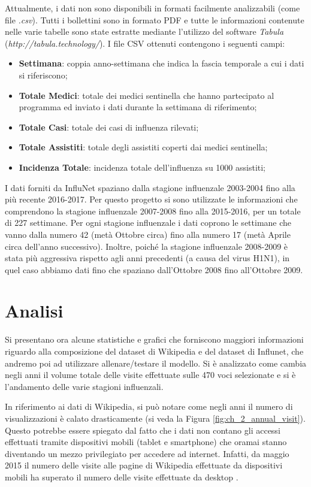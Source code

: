 Attualmente, i dati non sono disponibili in formati facilmente analizzabili (come file \textit{.csv}). Tutti i bollettini
sono in formato PDF e tutte le informazioni contenute nelle varie tabelle sono state estratte mediante l'utilizzo del software \textit{Tabula} (\textit{http://tabula.technology/}). I file CSV ottenuti contengono i seguenti campi:
\begin{itemize}[noitemsep]
\item \textbf{Settimana}: coppia anno-settimana che indica la fascia temporale a cui i dati si riferiscono;
\item \textbf{Totale Medici}: totale dei medici sentinella che hanno partecipato al programma ed inviato i dati durante la settimana di riferimento; 
\item \textbf{Totale Casi}: totale dei casi di influenza rilevati;
\item \textbf{Totale Assistiti}: totale degli assistiti coperti dai medici sentinella;
\item \textbf{Incidenza Totale}: incidenza totale dell'influenza su 1000 assistiti;
\end{itemize}
\bigskip

I dati forniti da InfluNet spaziano dalla stagione influenzale 2003-2004 fino alla più recente 2016-2017. Per questo progetto 
si sono utilizzate le informazioni che comprendono la stagione influenzale 2007-2008 fino alla 2015-2016, per un totale di 
227 settimane. Per ogni stagione influenzale i dati coprono le settimane che vanno dalla numero 42 (metà Ottobre circa) fino 
alla numero 17 (metà Aprile circa dell'anno successivo). Inoltre, poiché la stagione influenzale 2008-2009 è stata più 
aggressiva rispetto agli anni precedenti (a causa del virus H1N1), in quel caso abbiamo dati fino che spaziano dall'Ottobre 
2008 fino all'Ottobre 2009.

\section{Analisi}
\bigskip

Si presentano ora alcune statistiche e grafici che forniscono maggiori informazioni riguardo alla composizione del dataset di 
Wikipedia e del dataset di Influnet, che andremo poi ad utilizzare allenare/testare il modello. Si è analizzato come 
cambia negli anni il volume totale delle visite effettuate sulle 470 voci selezionate e si è 
l'andamento delle varie stagioni influenzali.
\bigskip

In riferimento ai dati di Wikipedia, si può notare come negli anni il numero di visualizzazioni è calato drasticamente (si 
veda la Figura \ref{fig:ch_2_annual_visit}). Questo potrebbe essere spiegato dal fatto che i dati non contano gli accessi 
effettuati tramite dispositivi mobili (tablet e smartphone) che oramai stanno diventando un mezzo privilegiato per accedere 
ad internet. Infatti, da maggio 2015 il numero delle visite alle pagine di Wikipedia effettuate da dispositivi mobili ha 
superato il numero delle visite effettuate da desktop \cite{wikipedia_mobile_desktop}.
\bigskip

